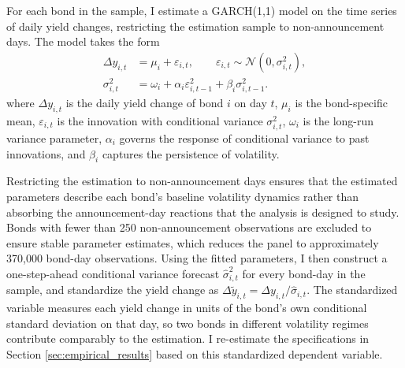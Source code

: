 \documentclass[english, 11pt, oneside]{article}
\begin{document}
For each bond in the sample, I estimate a GARCH(1,1) model on the time series of daily yield changes, restricting the estimation sample to non-announcement days. The model takes the form
\begin{align*}
\Delta y_{i,t} &= \mu_i + \varepsilon_{i,t}, \qquad \varepsilon_{i,t} \sim \mathcal{N}(0, \sigma^2_{i,t}), \\
\sigma^2_{i,t} &= \omega_i + \alpha_i \varepsilon^2_{i,t-1} + \beta_i \sigma^2_{i,t-1}.
\end{align*}
where $\Delta y_{i,t}$ is the daily yield change of bond $i$ on day $t$, $\mu_i$ is the bond-specific mean, $\varepsilon_{i,t}$ is the innovation with conditional variance $\sigma^2_{i,t}$, $\omega_i$ is the long-run variance parameter, $\alpha_i$ governs the response of conditional variance to past innovations, and $\beta_i$ captures the persistence of volatility.

Restricting the estimation to non-announcement days ensures that the estimated parameters describe each bond's baseline volatility dynamics rather than absorbing the announcement-day reactions that the analysis is designed to study. Bonds with fewer than 250 non-announcement observations are excluded to ensure stable parameter estimates, which reduces the panel to approximately 370,000 bond-day observations. Using the fitted parameters, I then construct a one-step-ahead conditional variance forecast $\hat{\sigma}^2_{i,t}$ for every bond-day in the sample, and standardize the yield change as $\Delta \tilde{y}_{i,t} = \Delta y_{i,t} / \hat{\sigma}_{i,t}$. The standardized variable measures each yield change in units of the bond's own conditional standard deviation on that day, so two bonds in different volatility regimes contribute comparably to the estimation. I re-estimate the specifications in Section \ref{sec:empirical_results} based on this standardized dependent variable.
\end{document}

